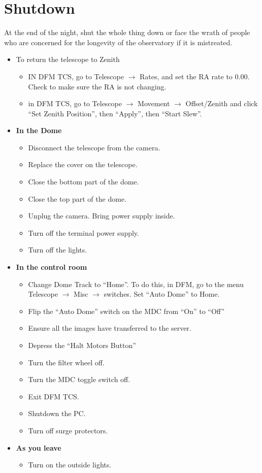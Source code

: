 \documentclass[letterpaper, 12pt]{report}
\begin{document}
\chapter{Shutdown}\label{ch:shutdown}
At the end of the night, shut the whole thing down or face the wrath of people who are concerned for the longevity of the observatory if it is mistreated.
\begin{itemize}
	\item To return the telescope to Zenith
	\begin{itemize}
		\item IN DFM TCS, go to Telescope $\rightarrow$ Rates, and set the RA rate to 0.00. Check to make sure the RA is not changing.
		\item in DFM TCS, go to Telescope $\rightarrow$ Movement $\rightarrow$ Offset/Zenith and click ``Set Zenith Position'', then ``Apply'', then ``Start Slew''.
	\end{itemize}
\end{itemize}
\begin{itemize}
	\item \large \textbf{In the Dome}
	\begin{itemize}
	\item Disconnect the telescope from the camera.
	\item Replace the cover on the telescope.
	\item Close the bottom part of the dome.
	\item Close the top part of the dome.
	\item Unplug the camera. Bring power supply inside.
	\item Turn off the terminal power supply.
	\item Turn off the lights.
	\end{itemize}

	\item \large \textbf{In the control room}
	\begin{itemize}
		\item Change Dome Track to ``Home''. To do this, in DFM, go to the menu Telescope $\rightarrow$ Misc $\rightarrow$ switches. Set ``Auto Dome'' to Home.
		\item Flip the ``Auto Dome'' switch on the MDC from ``On'' to ``Off''
		\item Ensure all the images have transferred to the server.
		\item Depress the ``Halt Motors Button''
		\item Turn the filter wheel off.
		\item Turn the MDC toggle switch off.
		\item Exit DFM TCS.
		\item Shutdown the PC.
		\item Turn off surge protectors.
	\end{itemize}

\item \large \textbf{As you leave}
\begin{itemize}
	\item Turn on the outside lights.
\end{itemize}
\end{itemize}
\newpage
\end{document}
